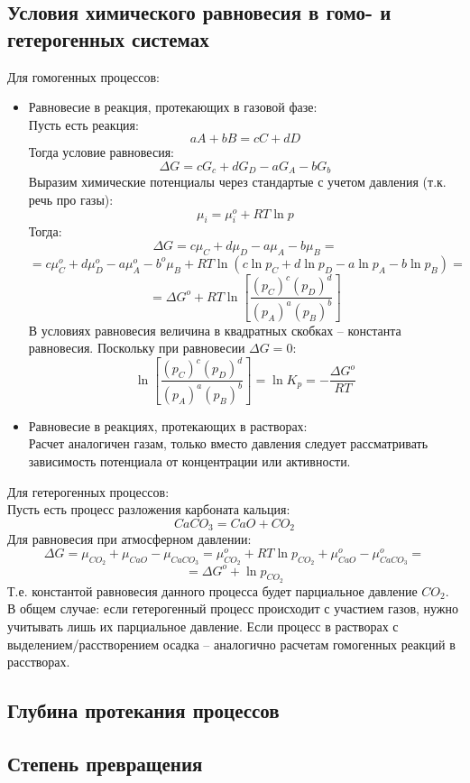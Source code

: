 \documentclass[14pt,a4paper]{scrartcl}
\begin{document}
	\subsection*{Условия химического равновесия в гомо- и гетерогенных системах}
	Для гомогенных процессов:
	\begin{itemize}
		\item Равновесие в реакция, протекающих в газовой фазе: \\
		Пусть есть реакция:
		$$ aA + bB = cC +  dD $$
		Тогда условие равновесия:
		$$ \Delta{G} = cG_c + dG_D - aG_A - bG_b $$
		Выразим химические потенциалы через стандартые с учетом давления (т.к. речь про газы):
		$$ \mu_i = \mu^o_i + RT \ln{p} $$
		Тогда:
		$$ \Delta{G} = c\mu_C + d\mu_D - a\mu_A - b\mu_B = $$
		$$ =c\mu^o_C + d\mu^o_D - a\mu^o_A - b^o\mu_B + RT \ln{(c\ln{p_C} + d\ln{p_D} - a\ln{p_A} - b\ln{p_B})} = $$
		$$ = \Delta{G^o} + RT \ln{\left[ \dfrac{(p_C)^c(p_D)^d}{(p_A)^a(p_B)^b}\right]} $$
		В условиях равновесия величина в квадратных скобках -- константа равновесия. Поскольку при равновесии $\Delta{G} = 0$:
		$$ \ln{\left[ \dfrac{(p_C)^c(p_D)^d}{(p_A)^a(p_B)^b}\right]} = \ln{K_p} = - \dfrac{\Delta{G^o}}{RT}  $$
		\item Равновесие в реакциях, протекающих в растворах:\\
		Расчет аналогичен газам, только вместо давления следует рассматривать зависимость потенциала от концентрации или активности.
	\end{itemize}
	Для гетерогенных процессов: \\
	Пусть есть процесс разложения карбоната кальция:
	$$ CaCO_3 = CaO + CO_2 $$
	Для равновесия при атмосферном давлении:
	$$ \Delta{G} = \mu_{CO_2} + \mu_{CaO} - \mu_{CaCO_3} = \mu_{CO_2}^o + RT \ln{p_{CO_2}} + \mu_{CaO}^o - \mu_{CaCO_3}^o = $$
	$$ = \Delta{G^o} + \ln{p_{CO_2}} $$
	Т.е. константой равновесия данного процесса будет парциальное давление $CO_2$. \\
	В общем случае: если гетерогенный процесс происходит с участием газов, нужно учитывать лишь  их парциальное давление. Если процесс в растворах с выделением/расстворением осадка -- аналогично расчетам гомогенных реакций в расстворах.
	\subsection*{Глубина протекания процессов}
	
	\subsection*{Степень превращения}
\end{document}
